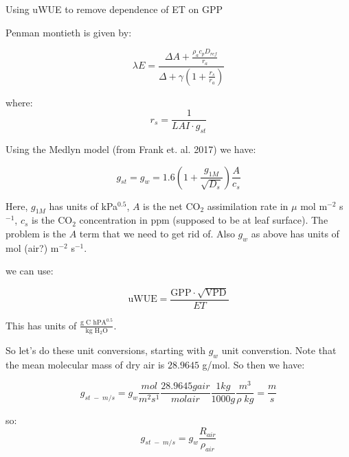 
\usepackage{graphics, graphicx}
\graphicspath{ {./} } %


\begin{center}
\large{Using uWUE to remove dependence of ET on GPP}\end{center}

\bigskip

Penman montieth is given by:

\begin{equation}
  \lambda E = \frac{\Delta A + \frac{\rho_a c_p D_{ref}}{r_a}}{\Delta + \gamma(1 + \frac{r_s}{r_a})}
\end{equation}

where:
\begin{equation}
  r_s = \frac{1}{LAI \cdot  g_{st}}
\end{equation}

Using the Medlyn model (from Frank et. al. 2017) we have:

\begin{equation}
g_{st} = g_{w} = 1.6 \left( 1 + \frac{g_{1M}}{\sqrt{D_s}} \right) \frac{A}{c_s}
\end{equation}

Here, $g_{1M}$ has units of kPa$^{0.5}$, $A$ is the net CO$_2$ assimilation rate in $\mu$ mol m$^{-2}$ s$^{-1}$, $c_s$ is the CO$_2$ concentration in ppm (supposed to be at leaf surface). The problem is the $A$ term that we need to get rid of. Also $g_w$ as above has units of mol (air?) m$^{-2}$ s$^{-1}$. 

we can use:

\begin{equation}
  \text{uWUE} = \frac{\text{GPP} \cdot \sqrt{\text{VPD}}}{ET}
\end{equation}

This has units of $\frac{\text{g C  hPA}^{0.5}}{\text{kg H$_2$O}}$.

So let's do these unit conversions, starting with $g_w$ unit converstion. Note that the mean molecular mass of dry air is $28.9645$ g/mol. So then we have:


\begin{equation}
  g_{st\; -\; m/s} = g_w \frac{mol}{m^2 s^1} \frac{28.9645 g air}{ mol air} \frac{1 kg}{1000 g} \frac{m^3}{\rho \; kg} = \frac{m}{s}
\end{equation}

so:
\begin{equation}
  g_{st\; -\; m/s} = g_w \frac{R_{air}}{\rho_{air}}
\end{equation}

